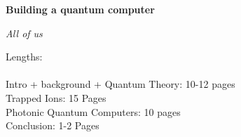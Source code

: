 \documentclass[a4paper]{article}
\begin{document}
\begin{center}
    \Huge \textbf{Building a quantum computer}
\end{center}
\vspace{-1em}

\begin{center}
    \emph{\large All of us}
\end{center}
\vspace{0.5em}
Lengths:\\ \\
Intro + background + Quantum Theory: 10-12 pages\\
Trapped Ions: 15 Pages\\
Photonic Quantum Computers: 10 pages\\
Conclusion: 1-2 Pages\\













\printbibliography
\end{document}
